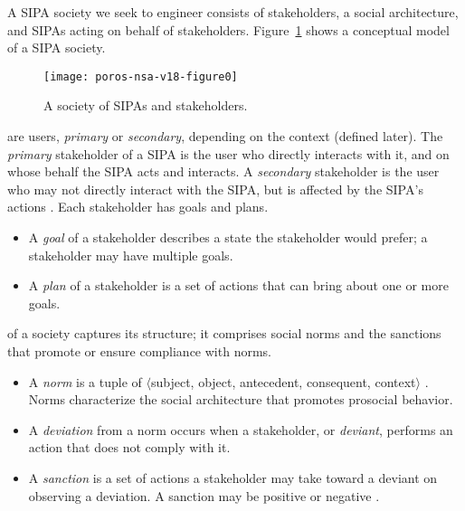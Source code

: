 A SIPA society we seek to engineer consists of stakeholders, a social architecture, and SIPAs acting on behalf of stakeholders. Figure~\ref{fig:Poros-model} shows a conceptual model of a SIPA society. %

\begin{figure}[!tb] \centering

\texttt{[image: poros-nsa-v18-figure0]}
\caption[A society of SIPAs and stakeholders]{A society of SIPAs and stakeholders.}
\label{fig:Poros-model} 
\end{figure}

 are users, \emph{primary} or \emph{secondary}, depending on the context (defined later).
The \emph{primary} stakeholder of a SIPA is the user who directly interacts with it, and on whose behalf the SIPA acts and interacts.
A \emph{secondary} stakeholder is the user who may not directly interact with the SIPA, but is affected by the SIPA's actions \citep{Ajmeri-AAMAS17-Arnor}. 
Each stakeholder has goals and plans.

\begin{itemize}[nosep]
  \item A \emph{goal} of a stakeholder describes a state the stakeholder would prefer; a stakeholder may have multiple goals.
  \item A \emph{plan} of a stakeholder is a set of actions that can bring about one or more goals.
\end{itemize}

 of a society captures its structure; it comprises social norms and the sanctions that promote or ensure compliance with norms.

\begin{itemize}[nosep]
  \item A \emph{norm} is a tuple of $\langle$subject, object, antecedent, consequent, context$\rangle$ \citep{Singh-2013-Norms}. 
    Norms characterize the social architecture that promotes prosocial behavior. 
  \item A \emph{deviation} from a norm occurs when a stakeholder, or \emph{deviant}, performs an action that does not comply with it.
  \item A \emph{sanction} is a set of actions a stakeholder may take toward a deviant on observing a deviation. A sanction may be positive or negative \citep{Nardin-KER16-Classifying}.
\end{itemize}

